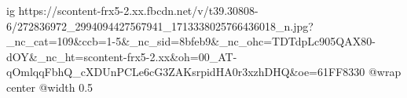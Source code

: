  
 
 
 
 

\ifcmt
  ig https://scontent-frx5-2.xx.fbcdn.net/v/t39.30808-6/272836972_2994094427567941_1713338025766436018_n.jpg?_nc_cat=109&ccb=1-5&_nc_sid=8bfeb9&_nc_ohc=TDTdpLc905QAX80-dOY&_nc_ht=scontent-frx5-2.xx&oh=00_AT-qOmlqqFbhQ_cXDUnPCLe6cG3ZAKsrpidHA0r3xzhDHQ&oe=61FF8330
  @wrap center
  @width 0.5
\fi

